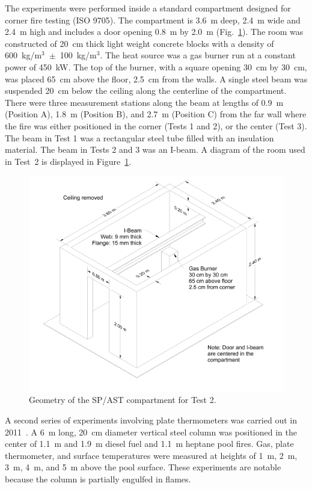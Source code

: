 The experiments were performed inside a standard compartment designed for corner fire testing (ISO 9705). The compartment is 3.6~m deep, 2.4~m wide and 2.4~m high and includes a door opening 0.8~m by 2.0~m (Fig.~\ref{Room_Drawing}). The room was constructed of 20~cm thick light weight concrete blocks with a density of 600~kg/m$^3$~$\pm$~100~kg/m$^3$. The heat source was a gas burner run at a constant power of 450~kW. The top of the burner, with a square opening 30~cm by 30~cm, was placed 65~cm above the floor, 2.5~cm from the walls. A single steel beam was suspended 20~cm below the ceiling along the centerline of the compartment. There were three measurement stations along the beam at lengths of 0.9~m (Position A), 1.8~m (Position B), and 2.7~m (Position C) from the far wall where the fire was either positioned in the corner (Tests 1 and 2), or the center (Test 3). The beam in Test 1 was a rectangular steel tube filled with an insulation material. The beam in Tests 2 and 3 was an I-beam. A diagram of the room used in Test~2 is displayed in Figure~\ref{Room_Drawing}.

\begin{figure}[ht]
\includegraphics[width=\textwidth]{FIGURES/SP_AST/SP_AST_Compartment_Drawing}
\caption{Geometry of the  SP/AST compartment for Test 2.}
\label{Room_Drawing}
\end{figure}

A second series of experiments involving plate thermometers was carried out in 2011~\cite{Sjostrom:AST}. A 6~m long, 20~cm diameter vertical steel column was positioned in the center of 1.1~m and 1.9~m diesel fuel and 1.1~m heptane pool fires. Gas, plate thermometer, and surface temperatures were measured at heights of 1~m, 2~m, 3~m, 4~m, and 5~m above the pool surface. These experiments are notable because the column is partially engulfed in flames.


